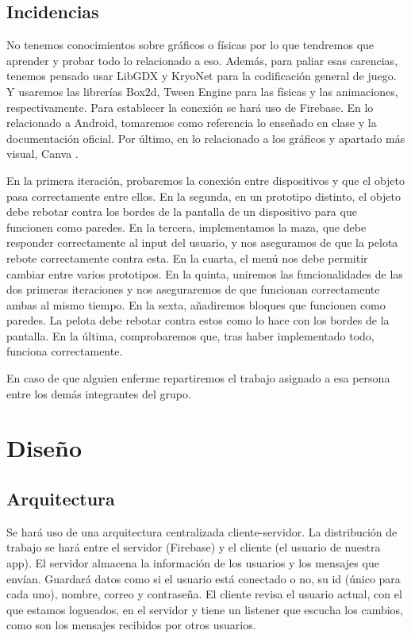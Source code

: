 \documentclass[a4paper,openright,12pt]{article}
\begin{document}
\subsection{Incidencias}
No tenemos conocimientos sobre gráficos o físicas por lo que tendremos que aprender y probar todo lo relacionado a eso. Además, para paliar esas carencias, tenemos pensado usar LibGDX\cite{misc-libGDX} y KryoNet\cite{misc-kryonet} para la codificación general de juego. Y usaremos las librerías Box2d\cite{misc-box2d}, Tween Engine\cite{misc-tween} para las físicas y las animaciones, respectivamente. Para establecer la conexión se hará uso de Firebase\cite{misc-firebase}. En lo relacionado a Android, tomaremos como referencia lo enseñado en clase y la documentación oficial\cite{misc-android-developers}. Por último, en lo relacionado a los gráficos y apartado más visual, Canva \cite{misc-canva}.
\par
En la primera iteración, probaremos la conexión entre dispositivos y que el objeto pasa correctamente entre ellos.
En la segunda, en un prototipo distinto, el objeto debe rebotar contra los bordes de la pantalla de un dispositivo para que funcionen como paredes.
En la tercera, implementamos la maza, que debe responder correctamente al input del usuario, y nos aseguramos de que la pelota rebote correctamente contra esta.
En la cuarta, el menú nos debe permitir cambiar entre varios prototipos.
En la quinta, uniremos las funcionalidades de las dos primeras iteraciones y nos aseguraremos de que funcionan correctamente ambas al mismo tiempo.
En la sexta, añadiremos bloques que funcionen como paredes. La pelota debe rebotar contra estos como lo hace con los bordes de la pantalla.
En la última, comprobaremos que, tras haber implementado todo, funciona correctamente.
\par
En caso de que alguien enferme repartiremos el trabajo asignado a esa persona entre los demás integrantes del grupo.

\section{Diseño}
\subsection{Arquitectura}
Se hará uso de una arquitectura centralizada cliente-servidor. La distribución de trabajo se hará entre el servidor (Firebase) y el cliente (el usuario de nuestra app). El servidor almacena la información de los usuarios y los mensajes que envían. Guardará datos como si el usuario está conectado o no, su id (único para cada uno), nombre, correo y contraseña. El cliente revisa el usuario actual, con el que estamos logueados, en el servidor y tiene un listener que escucha los cambios, como son los mensajes recibidos por otros usuarios.
\end{document}
